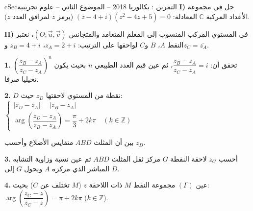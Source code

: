 \documentclass[12pt,a4paper]{article}
\newenvironment{BOX}[2]{\begin{otherlanguage}{english}\begin{arbox}{#1}{#2}}{\end{arbox}\end{otherlanguage}}
\newcounter{exo}
\newenvironment{tamrin}[1]{\stepcounter{exo}\begin{BOX}{cSec}{التمرين \theexo: #1}}{\end{BOX}}
\newcommand{\QQ}[1]{\par\smallskip\textbf{#1.} }
\begin{document}
\begin{tamrin}{بكالوريا 2018 -- الموضوع الثاني -- علوم تجريبية}
\textbf{I)} حل في مجموعة الأعداد المركبة $\mathbb{C}$ المعادلة: $\left(\overline{z}-4+i\right)\left(z^2-4z+5\right)=0$ (يرمز $\overline{z}$ لمرافق العدد $z$).

\textbf{II)} في المستوي المركب المنسوب إلى المعلم المتعامد والمتجانس $(O;\vec u,\vec v)$، نعتبر النقط $A$، $B$ و$C$ لواحقها على الترتيب: $z_A=2+i$، $z_B=4+i$ و$z_C=\overline{z_A}$.
\QQ{1} تحقق أن: $\dfrac{z_B-z_A}{z_C-z_A}=i$، ثم عين قيم العدد الطبيعي $n$ بحيث يكون $\left(\dfrac{z_B-z_A}{z_C-z_A}\right)^n$ تخيليا صرفا.
\QQ{2} $D$ نقطة من المستوي لاحقتها $z_D$ حيث:
$\begin{cases}|z_D-z_A|=|z_B-z_A|\\[2pt] \arg\left(\dfrac{z_D-z_A}{z_B-z_A}\right)=\dfrac{\pi}{3}+2k\pi\quad(k\in\mathbb{Z})\end{cases}$

بين أن المثلث $ABD$ متقايس الأضلاع وأحسب $z_D$.
\QQ{3} أحسب $z_G$ لاحقة النقطة $G$ مركز ثقل المثلث $ABD$ ثم عين نسبة وزاوية التشابه المباشر الذي مركزه $A$ ويحول $G$ إلى $D$.
\QQ{4} عين $(\Gamma)$ مجموعة النقط $M$ ذات اللاحقة $z$ ($M$ تختلف عن $C$) بحيث: $\arg\left(\dfrac{z_G-z}{z_C-z}\right)=\pi+2k\pi$ ($k\in\mathbb{Z}$).
\end{tamrin}
\end{document}

